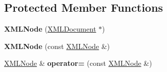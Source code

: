 \subsection*{Protected Member Functions}
\begin{DoxyCompactItemize}
\item 
\hypertarget{classtinyxml2_1_1_x_m_l_node_a29868df6ca383d574f584dfdd15105b6}{{\bfseries X\-M\-L\-Node} (\hyperlink{classtinyxml2_1_1_x_m_l_document}{X\-M\-L\-Document} $\ast$)}\label{classtinyxml2_1_1_x_m_l_node_a29868df6ca383d574f584dfdd15105b6}

\item 
\hypertarget{classtinyxml2_1_1_x_m_l_node_a78be01384518a969da905548f318d75b}{{\bfseries X\-M\-L\-Node} (const \hyperlink{classtinyxml2_1_1_x_m_l_node}{X\-M\-L\-Node} \&)}\label{classtinyxml2_1_1_x_m_l_node_a78be01384518a969da905548f318d75b}

\item 
\hypertarget{classtinyxml2_1_1_x_m_l_node_ade79231d908e1f21862819e00e56ab6e}{\hyperlink{classtinyxml2_1_1_x_m_l_node}{X\-M\-L\-Node} \& {\bfseries operator=} (const \hyperlink{classtinyxml2_1_1_x_m_l_node}{X\-M\-L\-Node} \&)}\label{classtinyxml2_1_1_x_m_l_node_ade79231d908e1f21862819e00e56ab6e}

\end{DoxyCompactItemize}
